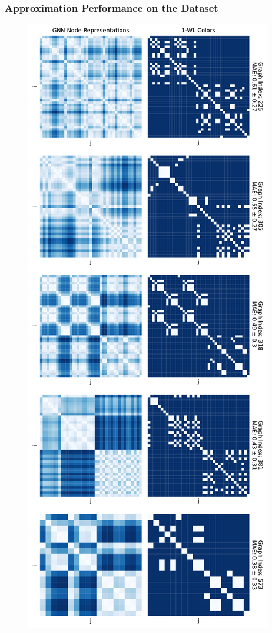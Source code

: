 \subsubsection{Approximation Performance on the \enzymes Dataset}
\begin{figure}[H]
    \centering
    \begin{minipage}[b]{0.45992852703\textwidth}
        \centering
        \includegraphics[width=\textwidth, left]{Figures/heatmaps_ENZYMES_0.pdf}

\end{minipage}
\end{figure}
